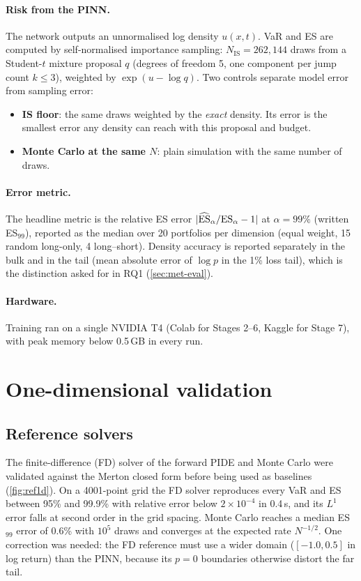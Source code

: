 \paragraph{Risk from the PINN.} The network outputs an unnormalised log density $u(x,t)$. VaR and ES are
computed by self-normalised importance sampling: $N_{\mathrm{IS}} = 262{,}144$ draws from a Student-$t$
mixture proposal $q$ (degrees of freedom 5, one component per jump count $k \le 3$), weighted by
$\exp(u - \log q)$. Two controls separate model error from sampling error:
\begin{itemize}
  \item \textbf{IS floor}: the same draws weighted by the \emph{exact} density. Its error is the smallest
        error any density can reach with this proposal and budget.
  \item \textbf{Monte Carlo at the same $N$}: plain simulation with the same number of draws.
\end{itemize}

\paragraph{Error metric.} The headline metric is the relative ES error
$|\widehat{\mathrm{ES}}_\alpha / \mathrm{ES}_\alpha - 1|$ at $\alpha = 99\%$ (written ES$_{99}$), reported as the median over
20 portfolios per dimension (equal weight, 15 random long-only, 4 long--short). Density accuracy is reported
separately in the bulk and in the tail (mean absolute error of $\log p$ in the 1\% loss tail), which is the
distinction asked for in RQ1 (\cref{sec:met-eval}).

\paragraph{Hardware.} Training ran on a single NVIDIA T4 (Colab for Stages 2--6, Kaggle for Stage 7), with
peak memory below 0.5\,GB in every run.

\section{One-dimensional validation}
\label{sec:res-1d}

\subsection{Reference solvers}
The finite-difference (FD) solver of the forward PIDE and Monte Carlo were validated against the Merton
closed form before being used as baselines (\cref{fig:ref1d}). On a 4001-point grid the FD solver
reproduces every VaR and ES between 95\% and 99.9\% with relative error below $2\times10^{-4}$ in 0.4\,s,
and its $L^1$ error falls at second order in the grid spacing. Monte Carlo reaches a median ES$_{99}$ error
of 0.6\% with $10^5$ draws and converges at the expected rate $N^{-1/2}$. One correction was needed: the FD
reference must use a wider domain ($[-1.0, 0.5]$ in log return) than the PINN, because its $p = 0$
boundaries otherwise distort the far tail.

